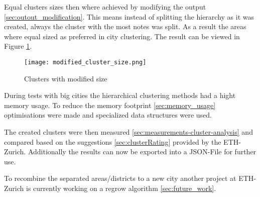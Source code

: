 Equal clusters sizes then where achieved by modifying the output \ref{sec:outout_modification}. This means instead of splitting the hierarchy as it was created, always the cluster with the most notes was split. As a result the areas where equal sized as preferred in city clustering. The result can be viewed in Figure  \ref{fig:cluster_with_mod_sizes}.

\begin{figure}[ht]
    \centering
    \begin{mdframed}[style=mdthight, userdefinedwidth=0.4\linewidth, align=center]
        \texttt{[image: modified\_cluster\_size.png]}
    \end{mdframed}
    \caption{Clusters with modified size}
    \label{fig:cluster_with_mod_sizes}
\end{figure}

During tests with big cities the hierarchical clustering methods had a hight memory usage. To reduce the memory footprint \ref{sec:memory_usage} optimisations were made and specialized data structures were used.

The created clusters were then measured \ref{sec:measurements-cluster-analysis} and compared based on the suggestions \ref{sec:clusterRating} provided by the ETH-Zurich. Additionally the results can now be exported into a JSON-File for further use.

To recombine the separated areas/districts to a new city another project at ETH-Zurich is currently working on a regrow algorithm \ref{sec:future_work}. 